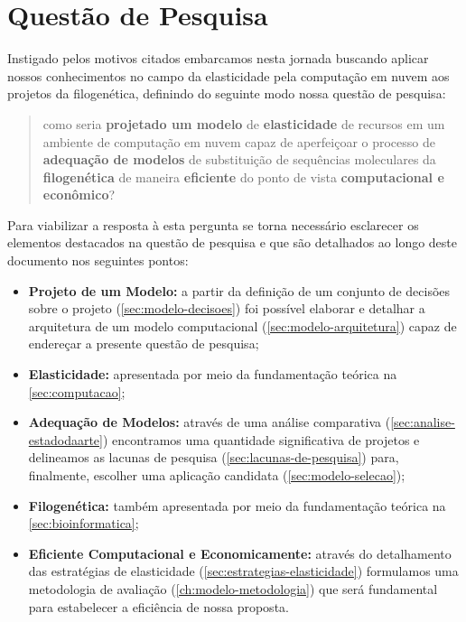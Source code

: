 \documentclass[english,brazilian]{UNISINOSmonografia} %
\begin{document}
\section{Questão de Pesquisa} %


Instigado pelos motivos citados embarcamos nesta jornada buscando aplicar nossos conhecimentos no campo da elasticidade pela computação em nuvem aos projetos da filogenética, definindo do seguinte modo nossa questão de pesquisa:


\begin{quote}
	\large
	como seria \textbf{projetado um modelo} de \textbf{elasticidade} de recursos em um ambiente de computação em nuvem capaz de aperfeiçoar o processo de \textbf{adequação de modelos} de substituição de sequências moleculares da \textbf{filogenética} de maneira \textbf{eficiente} do ponto de vista \textbf{computacional e econômico}?
	
\end{quote}


Para viabilizar a resposta à esta pergunta se torna necessário esclarecer os elementos destacados na questão de pesquisa e que são detalhados ao longo deste documento nos seguintes pontos:

\begin{itemize}
	
	\item \textbf{Projeto de um Modelo:} a partir da definição de um conjunto de decisões sobre o projeto (\autoref{sec:modelo-decisoes}) foi possível elaborar e detalhar a arquitetura de um modelo computacional (\autoref{sec:modelo-arquitetura}) capaz de endereçar a presente questão de pesquisa;
	
	\item \textbf{Elasticidade:} apresentada por meio da fundamentação teórica na \autoref{sec:computacao};
	
	\item \textbf{Adequação de Modelos:} através de uma análise comparativa (\autoref{sec:analise-estadodaarte}) encontramos uma quantidade significativa de projetos e delineamos as lacunas de pesquisa (\autoref{sec:lacunas-de-pesquisa}) para, finalmente, escolher uma aplicação candidata (\autoref{sec:modelo-selecao});
	
	\item \textbf{Filogenética:} também apresentada por meio da fundamentação teórica na \autoref{sec:bioinformatica};
	
	\item \textbf{Eficiente Computacional e Economicamente:} através do detalhamento das estratégias de elasticidade (\autoref{sec:estrategias-elasticidade}) formulamos uma metodologia de avaliação (\autoref{ch:modelo-metodologia}) que será fundamental para estabelecer a eficiência de nossa proposta.
\end{itemize}
\end{document}
